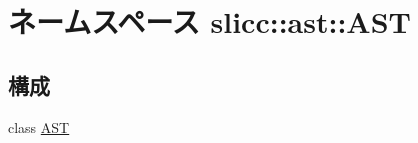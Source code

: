 \hypertarget{namespaceslicc_1_1ast_1_1AST}{
\section{ネームスペース slicc::ast::AST}
\label{namespaceslicc_1_1ast_1_1AST}
}
\subsection*{構成}
\begin{DoxyCompactItemize}
\item 
class \hyperlink{classslicc_1_1ast_1_1AST_1_1AST}{AST}
\end{DoxyCompactItemize}
